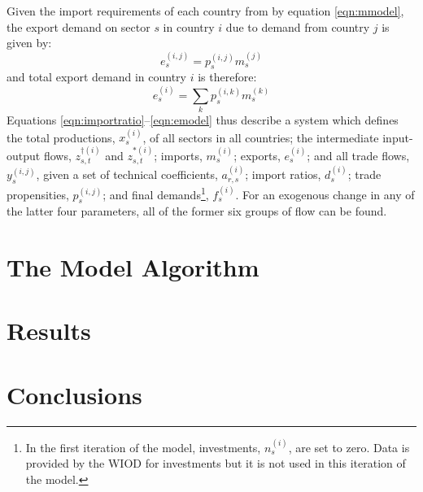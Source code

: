 \documentclass[a4paper]{article}
\begin{document}
Given the import requirements of each country from by equation \eqref{eqn:mmodel}, the export demand on sector $s$ in country $i$ due to demand from country $j$ is given by:
\begin{equation*}
e_s^{(i,j)} = p_s^{(i,j)}m_s^{(j)}
\end{equation*}
and total export demand in country $i$ is therefore:
\begin{equation}\label{eqn:emodel}
e_s^{(i)} = \sum_k{p_s^{(i,k)}m_s^{(k)}}
\end{equation}
\noindent Equations \eqref{eqn:importratio}--\eqref{eqn:emodel} thus describe a system which defines the total productions, $x_s^{(i)}$, of all sectors in all countries; the intermediate input-output flows, $z_{s,t}^{\dagger(i)}$ and $z_{s,t}^{*(i)}$; imports, $m_s^{(i)}$; exports, $e_s^{(i)}$; and all trade flows, $y_s^{(i,j)}$, given a set of technical coefficients, $a_{r,s}^{(i)}$; import ratios, $d_s^{(i)}$; trade propensities, $p_s^{(i,j)}$; and final demands\footnote{In the first iteration of the model, investments, $n_s^{(i)}$, are set to zero. 
Data is provided by the WIOD for investments but it is not used in this iteration of the model.}, $f_s^{(i)}$. For an exogenous change in any of the latter four parameters, all of the former six groups of flow can be found.

\section{The Model Algorithm}\label{sec:algorithm}


\section{Results}\label{sec:results}

\section{Conclusions}\label{sec:conclusions}

\printbibliography
\end{document}
